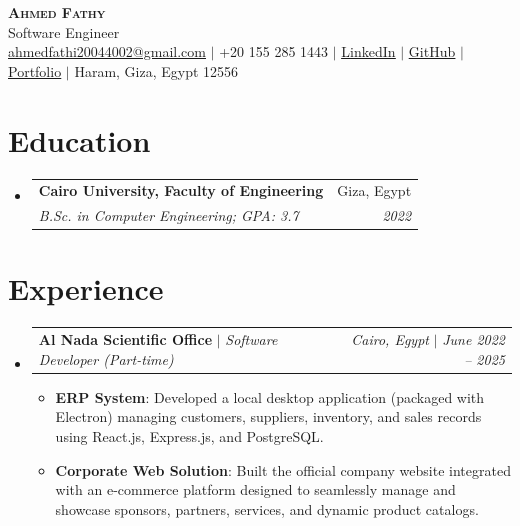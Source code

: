 \documentclass[letterpaper,11pt]{article}
\makeatletter
\newcommand{\resumeItem}[2]{\item\small{\textbf{#1}{: #2 \vspace{-2pt}}}}
\newcommand{\resumeSubheading}[4]{
  \vspace{-1pt}\item
    \begin{tabular*}{0.97\textwidth}{l@{\extracolsep{\fill}}r}
      \textbf{#1} & #2 \\
      \textit{\small#3} & \textit{\small #4} \\
    \end{tabular*}\vspace{-5pt}
}
\newcommand{\resumeActivitySubheading}[4]{
  \vspace{-1pt}\item
    \begin{tabular*}{0.97\textwidth}{l@{\extracolsep{\fill}}r}
      \textbf{#1} $|$ \textit{\small#3} & \textit{\small#2} $|$ \textit{\small #4} \\
    \end{tabular*}\vspace{-5pt}
}
\newcommand{\resumeSubHeadingListStart}{\begin{itemize}[leftmargin=*]}
\newcommand{\resumeSubHeadingListEnd}{\end{itemize}}
\newcommand{\resumeItemListStart}{\begin{itemize}}
\newcommand{\resumeItemListEnd}{\end{itemize}\vspace{-5pt}}
\makeatother
\begin{document}
\begin{center}
    \textbf{\Huge \scshape Ahmed Fathy} \\ \vspace{1pt}
    \small Software Engineer \\
    \href{mailto:ahmedfathi20044002@gmail.com}{\underline{ahmedfathi20044002@gmail.com}} $|$
    +20 155 285 1443 $|$
    \href{https://www.linkedin.com/in/ahmedfathy-x1}{\underline{LinkedIn}} $|$
    \href{https://github.com/ahmedfathy0-0}{\underline{GitHub}} $|$
    \href{https://www.mrfathi.tech/}{\underline{Portfolio}} $|$
    Haram, Giza, Egypt 12556
\end{center}


\section{Education}
  \resumeSubHeadingListStart
    \resumeSubheading
      {Cairo University, Faculty of Engineering}{Giza, Egypt}
      {B.Sc. in Computer Engineering;  GPA: 3.7}{2022}
  \resumeSubHeadingListEnd
\section{Experience}
  \resumeSubHeadingListStart
    \resumeActivitySubheading
      {Al Nada Scientific Office}{Cairo, Egypt}{Software Developer (Part-time)}{June 2022 -- 2025}
      \resumeItemListStart
        \resumeItem{ERP System}
          {Developed a local desktop application (packaged with Electron) managing customers, suppliers, inventory, and sales records using React.js, Express.js, and PostgreSQL.}
        \resumeItem{Corporate Web Solution}
          {Built the official company website integrated with an e-commerce platform designed to seamlessly manage and showcase sponsors, partners, services, and dynamic product catalogs.}
      \resumeItemListEnd
  \resumeSubHeadingListEnd
\end{document}
